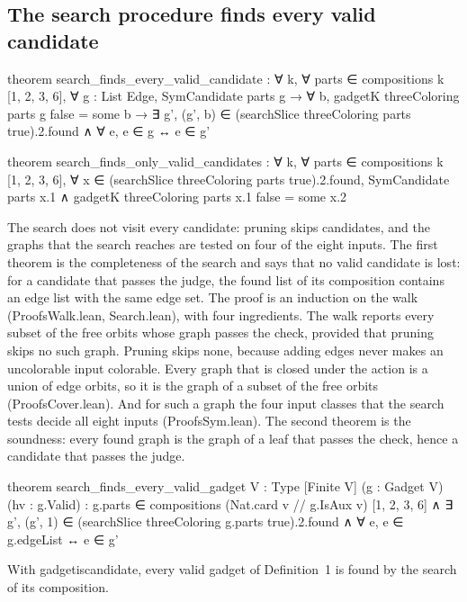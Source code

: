 \documentclass[11pt,a4paper]{article}
\newcommand{\leanus}{\textunderscore\allowbreak}
\newcommand{\lean}[1]{{\ttfamily\let\_\leanus #1}}
\begin{document}
\subsection{The search procedure finds every valid candidate}
\begin{code}
theorem search_finds_every_valid_candidate :
    ∀ k, ∀ parts ∈ compositions k [1, 2, 3, 6], ∀ g : List Edge,
      SymCandidate parts g → ∀ b, gadgetK threeColoring parts g false = some b →
        ∃ g', (g', b) ∈ (searchSlice threeColoring parts true).2.found ∧
          ∀ e, e ∈ g ↔ e ∈ g'

theorem search_finds_only_valid_candidates :
    ∀ k, ∀ parts ∈ compositions k [1, 2, 3, 6],
      ∀ x ∈ (searchSlice threeColoring parts true).2.found,
        SymCandidate parts x.1 ∧ gadgetK threeColoring parts x.1 false = some x.2
\end{code}
The search does not visit every candidate: pruning skips candidates, and the
graphs that the search reaches are tested on four of the eight inputs. The
first theorem is the completeness of the search and says that no valid
candidate is lost: for a candidate that passes the judge, the found list of
its composition contains an edge list with the same edge set. The proof is
an induction on
the walk (\lean{ProofsWalk.lean}, \lean{Search.lean}), with four
ingredients. The walk reports every subset of the free orbits whose graph
passes the check, provided that pruning skips no such graph. Pruning skips
none, because adding edges never makes an uncolorable input colorable. Every
graph that is closed under the action is a union of edge orbits, so it is
the graph of a subset of the free orbits (\lean{ProofsCover.lean}). And for
such a graph the four input classes that the search tests decide all eight
inputs (\lean{ProofsSym.lean}). The second theorem is the soundness: every
found graph is the graph of a leaf that passes the check, hence a candidate
that passes the judge.
\begin{code}
theorem search_finds_every_valid_gadget {V : Type} [Finite V] (g : Gadget V) (hv : g.Valid) :
    g.parts ∈ compositions (Nat.card {v // g.IsAux v}) [1, 2, 3, 6] ∧
    ∃ g', (g', 1) ∈ (searchSlice threeColoring g.parts true).2.found ∧
      ∀ e, e ∈ g.edgeList ↔ e ∈ g'
\end{code}
With \lean{gadget\_is\_candidate}, every valid gadget of Definition~1 is
found by the search of its composition.
\end{document}
